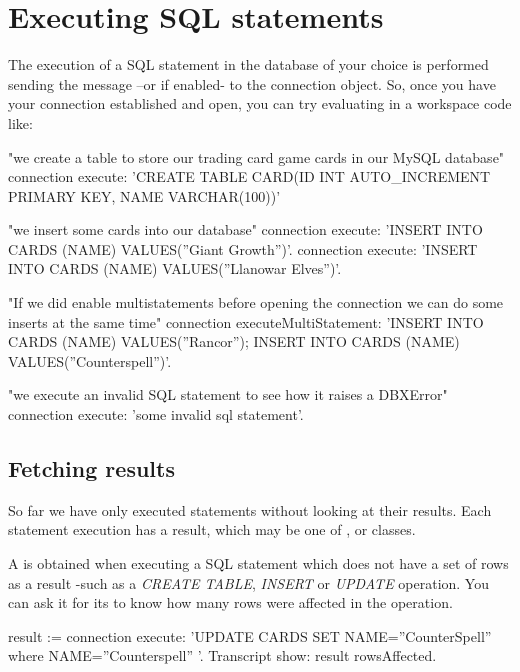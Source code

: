 \documentclass[a4paper,10pt,twoside]{book}
\begin{document}
\section{Executing SQL statements}
The execution of a SQL statement in the database of your choice is performed sending the  message --or  if enabled- to the connection object.  So, once you have your connection established and open, you can try evaluating in a workspace code like:

\begin{code}{}
"we create a table to store our trading card game cards in our MySQL database"
connection execute: 'CREATE TABLE CARD(ID INT AUTO_INCREMENT PRIMARY KEY, NAME VARCHAR(100))'

"we insert some cards into our database"
connection execute: 'INSERT INTO CARDS (NAME) VALUES(''Giant Growth'')'.
connection execute: 'INSERT INTO CARDS (NAME) VALUES(''Llanowar Elves'')'.

"If we did enable multistatements before opening the connection we can do some inserts at the same time"
connection executeMultiStatement: 'INSERT INTO CARDS (NAME) VALUES(''Rancor'');
                                   INSERT INTO CARDS (NAME) VALUES(''Counterspell'')'.

"we execute an invalid SQL statement to see how it raises a DBXError"
connection execute: 'some invalid sql statement'.
\end{code}

\subsection{Fetching results}
So far we have only executed statements without looking at their results.  Each statement execution has a result, which may be one of ,  or  classes.

A  is obtained when executing a SQL statement which does not have a set of rows as a result -such as a \emph{CREATE TABLE}, \emph{INSERT} or \emph{UPDATE} operation.  You can ask it for its  to know how many rows were affected in the operation.

\begin{code}{}
result := connection execute: 'UPDATE CARDS SET NAME=''CounterSpell'' where NAME=''Counterspell'' '.
Transcript show: result rowsAffected.
\end{code}
\end{document}

